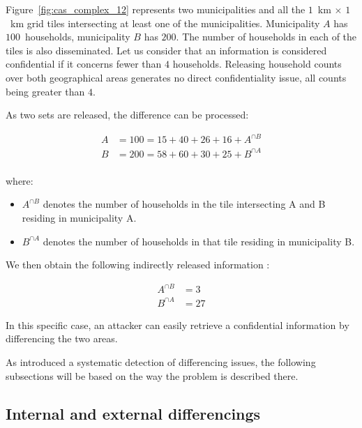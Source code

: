 Figure~\ref{fig:cas_complex_12} represents two municipalities and all the  $1$~km $\times$ $1$~km grid tiles intersecting at least one of the municipalities. Municipality $A$ has $100$~households, municipality $B$ has $200$. The number of households in each of the tiles is also disseminated. Let us consider that an information is considered confidential if it concerns fewer than $4$ households. Releasing household counts over both geographical areas generates no direct confidentiality issue, all counts being greater than $4$.

As two sets are released, the difference can be processed:

\begin{equation}
    \begin{split}
    A &= 100 = 15 + 40 + 26 + 16 + A^{\cap B} \\
    B &= 200 = 58 + 60 + 30 + 25 + B^{\cap A} \\
    \end{split}
    \label{eq:diff_interne}
\end{equation}

where:

\begin{itemize}
\item \(A^{\cap B}\) denotes the number of households in the tile intersecting A and B residing in municipality A.
\item \(B^{\cap A} \) denotes the number of households in that tile residing in municipality B. 
\end{itemize}

We then obtain the following indirectly released information :

\begin{equation}
    \begin{split}
    A^{\cap B} &= 3 \\
    B^{\cap A} &= 27 
    \end{split}
    \label{eq:diff_interne2}
\end{equation}

In this specific case, an attacker can easily retrieve a confidential information by differencing the two areas.


As \cite{Costemalle_2019} introduced a systematic detection of differencing issues, the following subsections will be based on the way the problem is described there.

\subsection{Internal and external differencings}

